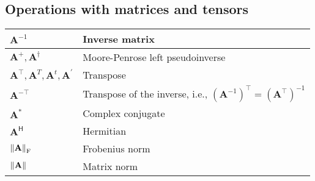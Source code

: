 \documentclass{article}
\begin{document}
\subsection{Operations with matrices and tensors}
\begin{xltabular}{\textwidth}{XX}
	\(\mathbf{A}^{-1}\)                                                                                  & Inverse matrix                                                                                                                                                                  \\ \hline
	\(\mathbf{A}^+, \mathbf{A}^{\dagger}\)                                                               & Moore-Penrose left pseudoinverse                                                                                                                                                \\ \hline
	\(\mathbf{A}^\top, \mathbf{A}^T, \mathbf{A}^t, \mathbf{A}^{'}\) \cite{searleMatrixAlgebraUseful2017} & Transpose                                                                                                                                                                       \\ \hline
	\(\mathbf{A}^{-\top}\)                                                                               & Transpose of the inverse, i.e., \(\left( \mathbf{A}^{-1} \right)^{\top} = \left( \mathbf{A}^{\top} \right)^{-1}\) \cite{petersenMatrixCookbook2008,golubMatrixComputations2013} \\ \hline
	\(\mathbf{A}^*\)                                                                                     & Complex conjugate                                                                                                                                                               \\ \hline
	\(\mathbf{A}^\mathsf{H}\)                                                                            & Hermitian                                                                                                                                                                       \\ \hline
	\(\norm{\mathbf{A}}_\textrm{F}\)                                                                                & Frobenius norm                                                                                                                                                                  \\ \hline
	\(\norm{\mathbf{A}}\)                                                                                & Matrix norm                                                                                                                                                                     \\ \hline

\end{xltabular}
\end{document}
